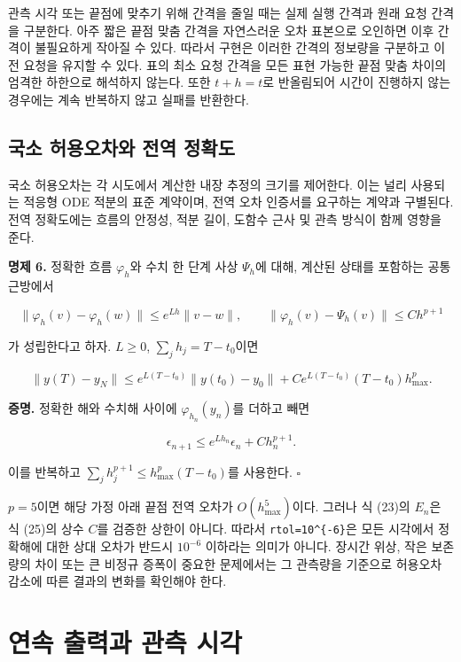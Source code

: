 \documentclass[
  10pt,
  dvipsnames]{article}
\begin{document}
관측 시각 또는 끝점에 맞추기 위해 간격을 줄일 때는 실제 실행 간격과 원래
요청 간격을 구분한다. 아주 짧은 끝점 맞춤 간격을 자연스러운 오차
표본으로 오인하면 이후 간격이 불필요하게 작아질 수 있다. 따라서 구현은
이러한 간격의 정보량을 구분하고 이전 요청을 유지할 수 있다. 표의 최소
요청 간격을 모든 표현 가능한 끝점 맞춤 차이의 엄격한 하한으로 해석하지
않는다. 또한 \(t+h=t\)로 반올림되어 시간이 진행하지 않는 경우에는 계속
반복하지 않고 실패를 반환한다.

\hypertarget{uxad6duxc18c-uxd5c8uxc6a9uxc624uxcc28uxc640-uxc804uxc5ed-uxc815uxd655uxb3c4}{%
\subsection{국소 허용오차와 전역
정확도}\label{uxad6duxc18c-uxd5c8uxc6a9uxc624uxcc28uxc640-uxc804uxc5ed-uxc815uxd655uxb3c4}}

국소 허용오차는 각 시도에서 계산한 내장 추정의 크기를 제어한다. 이는
널리 사용되는 적응형 ODE 적분의 표준 계약이며, 전역 오차 인증서를
요구하는 계약과 구별된다. 전역 정확도에는 흐름의 안정성, 적분 길이,
도함수 근사 및 관측 방식이 함께 영향을 준다.

\textbf{명제 6.} 정확한 흐름 \(\varphi_h\)와 수치 한 단계 사상
\(\Psi_h\)에 대해, 계산된 상태를 포함하는 공통 근방에서

\[
 \|\varphi_h(v)-\varphi_h(w)\|\le e^{Lh}\|v-w\|,\qquad
 \|\varphi_h(v)-\Psi_h(v)\|\le C h^{p+1}
 \tag{25}
\]

가 성립한다고 하자. \(L\ge0\), \(\sum_jh_j=T-t_0\)이면

\[
 \|y(T)-y_N\|
 \le e^{L(T-t_0)}\|y(t_0)-y_0\|
 +C e^{L(T-t_0)}(T-t_0)h_{\max}^{p}.
 \tag{26}
\]

\textbf{증명.} 정확한 해와 수치해 사이에 \(\varphi_{h_n}(y_n)\)를 더하고
빼면

\[
 \epsilon_{n+1}\le e^{Lh_n}\epsilon_n+Ch_n^{p+1}.
 \tag{27}
\]

이를 반복하고 \(\sum_jh_j^{p+1}\le h_{\max}^p(T-t_0)\)를 사용한다.
\(\square\)

\(p=5\)이면 해당 가정 아래 끝점 전역 오차가 \(O(h_{\max}^5)\)이다.
그러나 식 (23)의 \(E_n\)은 식 (25)의 상수 \(C\)를 검증한 상한이 아니다.
따라서 \texttt{rtol=10\^{}\{-6\}}은 모든 시각에서 정확해에 대한 상대
오차가 반드시 \(10^{-6}\) 이하라는 의미가 아니다. 장시간 위상, 작은
보존량의 차이 또는 큰 비정규 증폭이 중요한 문제에서는 그 관측량을
기준으로 허용오차 감소에 따른 결과의 변화를 확인해야 한다.

\hypertarget{uxc5f0uxc18d-uxcd9cuxb825uxacfc-uxad00uxce21-uxc2dcuxac01}{%
\section{연속 출력과 관측
시각}\label{uxc5f0uxc18d-uxcd9cuxb825uxacfc-uxad00uxce21-uxc2dcuxac01}}
\end{document}
